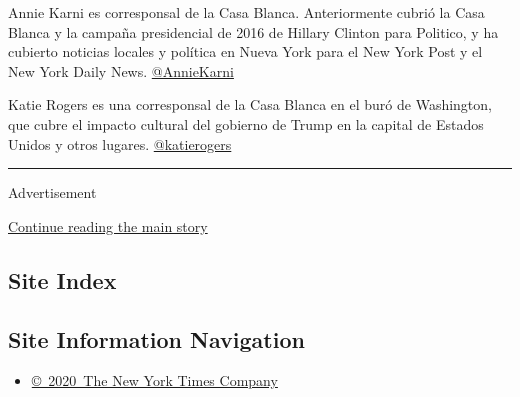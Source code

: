 Annie Karni es corresponsal de la Casa Blanca. Anteriormente cubrió la
Casa Blanca y la campaña presidencial de 2016 de Hillary Clinton para
Politico, y ha cubierto noticias locales y política en Nueva York para
el New York Post y el New York Daily News.
\href{https://twitter.com/AnnieKarni}{@AnnieKarni}

Katie Rogers es una corresponsal de la Casa Blanca en el buró de
Washington, que cubre el impacto cultural del gobierno de Trump en la
capital de Estados Unidos y otros lugares.
\href{https://twitter.com/katierogers}{@katierogers}

\begin{center}\rule{0.5\linewidth}{\linethickness}\end{center}

Advertisement

\protect\hyperlink{after-bottom}{Continue reading the main story}

\hypertarget{site-index}{%
\subsection{Site Index}\label{site-index}}

\hypertarget{site-information-navigation}{%
\subsection{Site Information
Navigation}\label{site-information-navigation}}

\begin{itemize}
\tightlist
\item
  \href{https://help.nytimes3xbfgragh.onion/hc/en-us/articles/115014792127-Copyright-notice}{©~2020~The
  New York Times Company}
\end{itemize}

